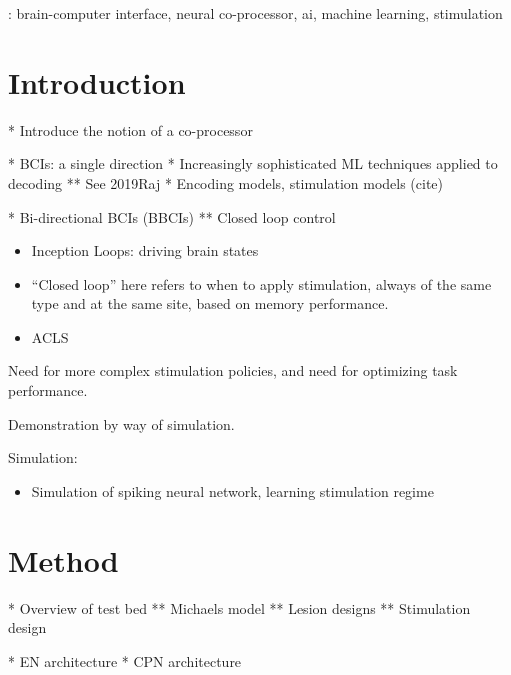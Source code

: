 \documentclass[12pt]{iopart}
\begin{document}
\vspace{2pc}
: brain-computer interface, neural co-processor, ai, machine learning, stimulation
%
%
\maketitle
% 
%



\section{Introduction}

* Introduce the notion of a co-processor

* BCIs: a single direction
* Increasingly sophisticated ML techniques applied to decoding
** See 2019Raj
* Encoding models, stimulation models (cite)

* Bi-directional BCIs (BBCIs)
** Closed loop control
\begin{itemize}
	\item \cite{walker.inception} Inception Loops: driving brain states
	\item \cite{kahana.biomarker} “Closed loop” here refers to when to apply stimulation, always of the same type and at the same site, based on memory performance.
	\item \cite{tafazoli.acls} ACLS
\end{itemize}

Need for more complex stimulation policies, and need for optimizing task performance.

Demonstration by way of simulation.

Simulation:
\begin{itemize}
	\item \cite{bernal.sim} Simulation of spiking neural network, learning stimulation regime
\end{itemize}

\section{Method}

* Overview of test bed
** Michaels model
** Lesion designs
** Stimulation design

* EN architecture
* CPN architecture
\end{document}
